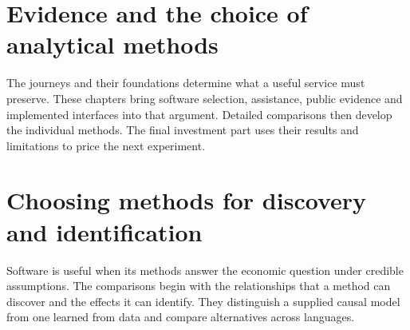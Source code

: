 \documentclass[11pt,a4paper,openany]{book}
\begin{document}








\part{Evidence and the choice of analytical methods}
\label{rewrite:part-synthesis}
The journeys and their foundations determine what a useful service must
preserve. These chapters bring software selection, assistance, public
evidence and implemented interfaces into that argument. Detailed comparisons
then develop the individual methods. The final investment part uses their
results and limitations to price the next experiment.








\part{Choosing methods for discovery and identification}
\label{reading:part-methods}
Software is useful when its methods answer the economic question under
credible assumptions. The comparisons begin with the relationships that a
method can discover and the effects it can identify. They distinguish a supplied
causal model from one learned from data and compare alternatives across languages.











\end{document}
